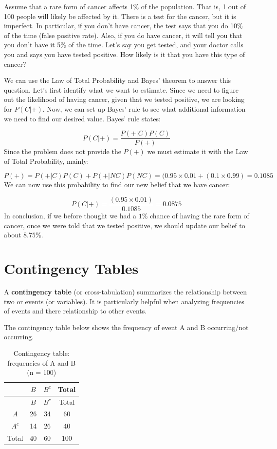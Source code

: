 \documentclass[
  11pt,
  letterpaper,
  DIV=11,
  numbers=noendperiod,
  oneside,
  open=any]{scrreprt}
\begin{document}
\begin{bsexample}[Example]

Assume that a rare form of cancer affects 1\% of the population. That
is, 1 out of 100 people will likely be affected by it. There is a test
for the cancer, but it is imperfect. In particular, if you don't have
cancer, the test says that you do 10\% of the time (false positive
rate). Also, if you do have cancer, it will tell you that you don't have
it 5\% of the time. Let's say you get tested, and your doctor calls you
and says you have tested positive. How likely is it that you have this
type of cancer?

We can use the Law of Total Probability and Bayes' theorem to answer
this question. Let's first identify what we want to estimate. Since we
need to figure out the likelihood of having cancer, given that we tested
positive, we are looking for \(P(C|+)\). Now, we can set up Bayes' rule
to see what additional information we need to find our desired value.
Bayes' rule states:

\[P(C|+)= \frac{P(+|C)P(C)}{P(+)}\] Since the problem does not provide
the \(P(+)\) we must estimate it with the Law of Total Probability,
mainly:

\[P(+)=P(+|C)P(C)+P(+|NC)P(NC)=(0.95 \times 0.01+(0.1 \times 0.99)=0.1085\]
We can now use this probability to find our new belief that we have
cancer:

\[P(C|+)= \frac{(0.95 \times 0.01) }{0.1085}=0.0875\] In conclusion, if
we before thought we had a \(1\%\) chance of having the rare form of
cancer, once we were told that we tested positive, we should update our
belief to about \(8.75\%\).

\end{bsexample}

\section{Contingency Tables}\label{contingency-tables}

A \textbf{contingency table} (or cross-tabulation) summarizes the
relationship between two or events (or variables). It is particularly
helpful when analyzing frequencies of events and there relationship to
other events.

The contingency table below shows the frequency of event A and B
occurring/not occurring.

\begin{longtable}[]{@{}cccc@{}}
\caption{Contingency table: frequencies of A and B (n =
100)}\tabularnewline
\toprule\noalign{}
& \(B\) & \(B^c\) & Total \\
\midrule\noalign{}
\endfirsthead
\toprule\noalign{}
& \(B\) & \(B^c\) & Total \\
\midrule\noalign{}
\endhead
\bottomrule\noalign{}
\endlastfoot
\(A\) & 26 & 34 & 60 \\
\(A^c\) & 14 & 26 & 40 \\
Total & 40 & 60 & 100 \\
\end{longtable}
\end{document}
